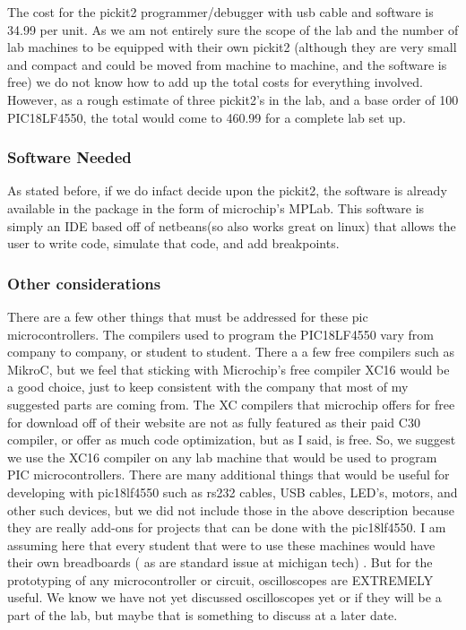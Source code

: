 \documentclass[12pt]{article}
\begin{document}
\noindent
The cost for the pickit2 programmer/debugger with usb cable and software is 34.99 per unit.
As we am not entirely sure the scope of the lab and the number of lab machines to be equipped with
their own pickit2 (although they are very small and compact and could be moved from machine
to machine, and the software is free) we do not know how to add up the total costs for everything
involved.
However, as a rough estimate of three pickit2's in the lab, and a base order of 100 PIC18LF4550,
the total would come to 460.99 for a complete lab set up.

\subsubsection{Software Needed}
As stated before, if we do infact decide upon the pickit2, the software is already available in the
package in the form of microchip's MPLab.
This software is simply an IDE based off of netbeans(so also works great on linux) that allows the
user to write code, simulate that code, and add breakpoints.

\subsubsection{Other considerations}
There are a few other things that must be addressed for these pic microcontrollers. The compilers
used to program the PIC18LF4550 vary from company to company, or student to student. There a
a few free compilers such as MikroC, but we feel that sticking with Microchip's free compiler XC16
would be a good choice, just to keep consistent with the company that most of my suggested parts
are coming from. The XC compilers that microchip offers for free for download off of their website
are not as fully featured as their paid C30 compiler, or offer as much code optimization, but as I
said, is free. So, we suggest we use the XC16 compiler on any lab machine that would be used to
program PIC microcontrollers.
There are many additional things that would be useful for developing with pic18lf4550 such as
rs232 cables, USB cables, LED's, motors, and other such devices, but we did not include those
in the above description because they are really add-ons for projects that can be done with the
pic18lf4550.
I am assuming here that every student that were to use these machines would have their
own breadboards ( as are standard issue at michigan tech) . But for the prototyping of any
microcontroller or circuit, oscilloscopes are EXTREMELY useful. We know we have not yet
discussed oscilloscopes yet or if they will be a part of the lab, but maybe that is something to
discuss at a later date.
\end{document}
